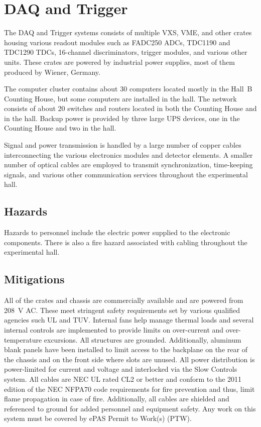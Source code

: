 \section{DAQ and Trigger}

The DAQ and Trigger systems consists of multiple VXS, VME, and other crates housing 
various readout modules such as FADC250 ADCs, TDC1190 and TDC1290 TDCs, 16-channel 
discriminators, trigger modules, and various other units. These crates are powered 
by industrial power supplies, most of them produced by Wiener, Germany.

The computer cluster contains about 30 computers located mostly in the Hall~B Counting 
House, but some computers are installed in the hall. The network consists of about 20 
switches and routers located in both the Counting House and in the hall. Backup power 
is provided by three large UPS devices, one in the Counting House and two in the hall.

Signal and power transmission is handled by a large number of copper cables interconnecting  
the various electronics modules and detector elements. A smaller number of optical cables 
are employed to transmit synchronization, time-keeping signals, and various other 
communication services throughout the experimental hall.

\subsection{Hazards} 

Hazards to personnel include the electric power supplied to the electronic components. There 
is also a fire hazard associated with cabling throughout the experimental hall.

\subsection{Mitigations}

All of the crates and chassis are commercially available and are powered from 208~V AC. 
These meet stringent safety requirements set by various qualified agencies such UL and TUV. 
Internal fans help manage thermal loads and several internal controls are implemented to 
provide limits on over-current and over-temperature excursions. All structures are grounded. 
Additionally, aluminum blank panels have been installed to limit access to the backplane on 
the rear of the chassis and on the front side where slots are unused. All power distribution 
is power-limited for current and voltage and interlocked via the Slow Controls system. All 
cables are NEC UL rated CL2 or better and conform to the 2011 edition of the NEC NFPA70 code 
requirements for fire prevention and thus, limit flame propagation in case of fire. Additionally, 
all cables are shielded and referenced to ground for added personnel and equipment safety.
Any work on this system must be covered by ePAS Permit to Work(s) (PTW).

